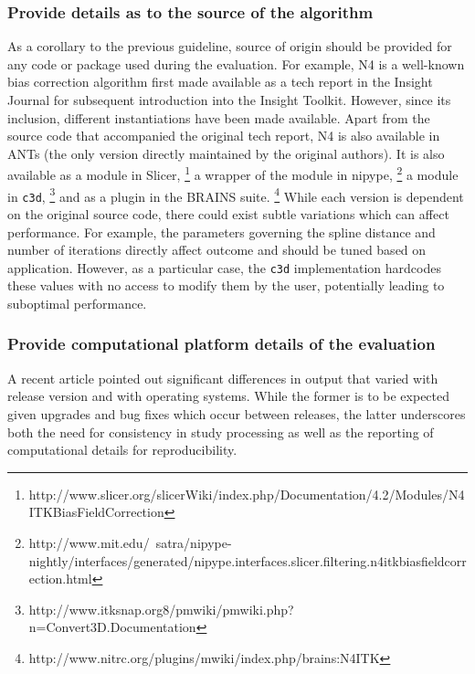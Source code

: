 \documentclass[final,5p,times,twocolumn]{elsarticle}
\begin{document}
\subsubsection{Provide details as to the source of the algorithm}
As a corollary to the previous guideline, source of origin
should be provided for any code or package used during the
evaluation.  For example, N4 \cite{tustison2010} is a well-known 
bias correction algorithm first made available as a tech report
in the Insight Journal \cite{tustison2009a} for subsequent introduction
into the Insight Toolkit.  However, since
its inclusion, different instantiations have been made available.  
Apart from the source code that accompanied the original tech
report, N4 is also available in ANTs (the only version directly maintained
by the original authors).
It is also available as a module in Slicer,%
\footnote{
http://www.slicer.org/slicerWiki/index.php/Documentation/4.2/Modules/N4ITKBiasFieldCorrection
}
a wrapper of the  module in nipype,%
\footnote{
http://www.mit.edu/~satra/nipype-nightly/interfaces/generated/nipype.interfaces.slicer.filtering.n4itkbiasfieldcorrection.html
}
a module in \verb#c3d#,%
\footnote{
http://www.itksnap.org8/pmwiki/pmwiki.php?n=Convert3D.Documentation
}
and as a plugin in the BRAINS suite.%
\footnote{
http://www.nitrc.org/plugins/mwiki/index.php/brains:N4ITK
}
While each version is dependent on the original source
code, there could exist subtle variations which can affect performance.
For example, the parameters governing the spline distance and 
number of iterations directly affect outcome and should be tuned
based on application.  However, as a particular case, the \verb#c3d# 
implementation hard\added[id=tr]{-}codes
these values with no access to modify them by the user, potentially
leading to suboptimal performance.

\subsubsection{Provide computational platform details of the evaluation}
A recent article \cite{gronenschild2012} pointed out significant
differences in  output that varied with  release
version and with operating systems.  While the former is to be
expected given upgrades and bug fixes which occur between releases,
the latter underscores both the need for consistency in study processing
as well as the reporting of computational details for reproducibility. 
\end{document}
